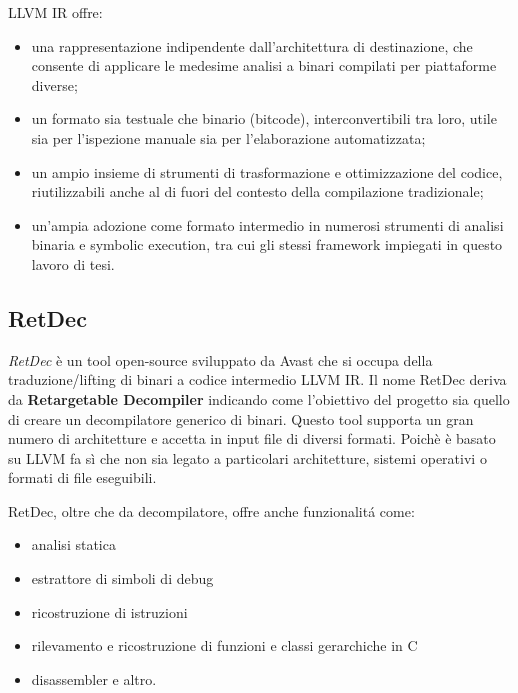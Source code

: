 LLVM IR offre:
\begin{itemize}[noitemsep]
    \item una rappresentazione indipendente dall'architettura di destinazione, che consente di applicare le medesime analisi a binari compilati per piattaforme diverse;
    \item un formato sia testuale che binario (bitcode), interconvertibili tra loro, utile sia per l'ispezione manuale sia per l'elaborazione automatizzata;
    \item un ampio insieme di strumenti di trasformazione e ottimizzazione del codice, riutilizzabili anche al di fuori del contesto della compilazione tradizionale;
    \item un'ampia adozione come formato intermedio in numerosi strumenti di analisi binaria e symbolic execution, tra cui gli stessi framework impiegati in questo lavoro di tesi.
\end{itemize}

\subsection{RetDec}
\label{subsec:retdec}
\textit{RetDec} è un tool open-source sviluppato da Avast che si occupa della traduzione/lifting di binari a codice intermedio LLVM IR. Il nome RetDec deriva da \textbf{Retargetable Decompiler} indicando come l'obiettivo del progetto sia quello di creare un decompilatore generico di binari. Questo tool supporta un gran numero di architetture e accetta in input file di diversi formati. Poichè è basato su LLVM fa sì che non sia legato a particolari architetture, sistemi operativi o formati di file eseguibili.\cite{retdec}

RetDec, oltre che da decompilatore, offre anche funzionalitá come: 
\begin{itemize}[noitemsep]
    \item analisi statica
    \item estrattore di simboli di debug
    \item ricostruzione di istruzioni
    \item rilevamento e ricostruzione di funzioni e classi gerarchiche in C
    \item disassembler e altro.
\end{itemize}

